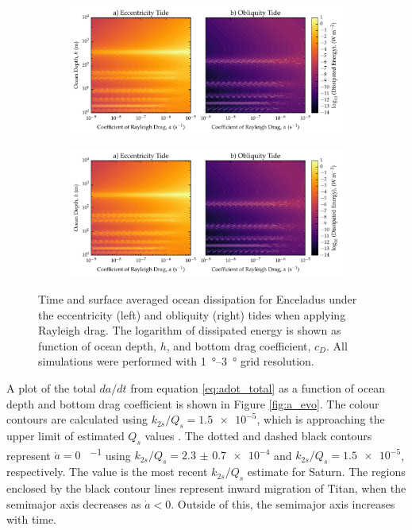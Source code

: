\begin{figure}[!t]
    \centering
    \begin{subfigure}[t]{0.85\linewidth} %
        \includegraphics[width=\linewidth]{Figures/enceladus_linear}
        \label{fig:lincEccEncel}
    \end{subfigure}
    \begin{subfigure}[t]{0\linewidth} %
         \includegraphics[width=\linewidth]{Figures/enceladus_linear}
         \label{fig:linObliqEncel} 
    \end{subfigure}
    \vspace{-0.5cm}
\caption{Time and surface averaged ocean dissipation for Enceladus under the eccentricity (left) and obliquity (right) tides when applying Rayleigh drag. The logarithm of dissipated energy is shown as function of ocean depth, $h$, and bottom drag coefficient, $c_D$. All simulations were performed with \SIrange{1}{3}{\degree} grid resolution. \label{fig:linEncel}}
\end{figure}

A plot of the total $da/dt$ from equation \ref{eq:adot_total} as a function of ocean depth and bottom drag coefficient is shown in Figure \ref{fig:a_evo}. The colour contours are calculated using $k_{2s}/Q_s = \num{1.5e-5}$, which is approaching the upper limit of estimated $Q_s$ values \citep{peale1980tidal,meyer2007tidal}. The dotted and dashed black contours represent $\dot{a}=0$ \si{\AU\per\year} using $k_{2s}/Q_s = \num[separate-uncertainty = true]{2.3(07)e-4}$ \citep{lainey2012strong} and $k_{2s}/Q_s = \num{1.5e-5}$, respectively. The \citet{lainey2012strong} value is the most recent $k_{2s}/Q_s$ estimate for Saturn. The regions enclosed by the black contour lines represent inward migration of Titan, when the semimajor axis decreases as $\dot{a} < 0$. Outside of this, the semimajor axis increases with time. 

